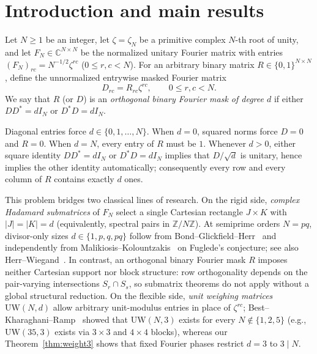 \documentclass[11pt,reqno]{amsart}
\numberwithin{equation}{section}
\theoremstyle{definition}
\theoremstyle{remark}
\newcommand{\C}{\mathbb{C}}
\newcommand{\Z}{\mathbb{Z}}
\begin{document}
\maketitle

\section{Introduction and main results}
\label{sec:intro}

Let $N\ge 1$ be an integer, let $\zeta=\zeta_N$ be a primitive complex $N$-th root of unity, and let $F_N\in\C^{N\times N}$ be the normalized unitary Fourier matrix with entries $(F_N)_{rc}=N^{-1/2}\zeta^{rc}$ ($0\le r,c<N$). For an arbitrary binary matrix $R\in\{0,1\}^{N\times N}$, define the unnormalized entrywise masked Fourier matrix
\begin{equation}
\label{eq:mask-def}
D_{rc} = R_{rc}\zeta^{rc},\qquad 0\le r,c<N.
\end{equation}
We say that $R$ (or $D$) is an \emph{orthogonal binary Fourier mask of degree $d$} if either $DD^*=dI_N$ or $D^*D=dI_N$.

Diagonal entries force $d\in\{0,1,\ldots,N\}$. When $d=0$, squared norms force $D=0$ and $R=0$. When $d=N$, every entry of $R$ must be $1$. Whenever $d>0$, either square identity $DD^*=dI_N$ or $D^*D=dI_N$ implies that $D/\sqrt{d}$ is unitary, hence implies the other identity automatically; consequently every row and every column of $R$ contains exactly $d$ ones.

This problem bridges two classical lines of research. On the rigid side, \emph{complex Hadamard submatrices} of $F_N$ select a single Cartesian rectangle $J\times K$ with $|J|=|K|=d$ (equivalently, spectral pairs in $\Z/N\Z$). At semiprime orders $N=pq$, divisor-only sizes $d\in\{1,p,q,pq\}$ follow from Bond--Glickfield--Herr~\cite[Theorem~1]{BGH19} and independently from Malikiosis--Kolountzakis~\cite[Theorem~1.2]{MK17} on Fuglede's conjecture; see also Herr--Wiegand~\cite{HW21}. In contrast, an orthogonal binary Fourier mask $R$ imposes neither Cartesian support nor block structure: row orthogonality depends on the pair-varying intersections $S_r\cap S_s$, so submatrix theorems do not apply without a global structural reduction. On the flexible side, \emph{unit weighing matrices} $\mathrm{UW}(N,d)$ allow arbitrary unit-modulus entries in place of $\zeta^{rc}$; Best--Kharaghani--Ramp~\cite{BKR13} showed that $\mathrm{UW}(N,3)$ exists for every $N\notin\{1,2,5\}$ (e.g., $\mathrm{UW}(35,3)$ exists via $3\times 3$ and $4\times 4$ blocks), whereas our Theorem~\ref{thm:weight3} shows that fixed Fourier phases restrict $d=3$ to $3\mid N$.
\end{document}
